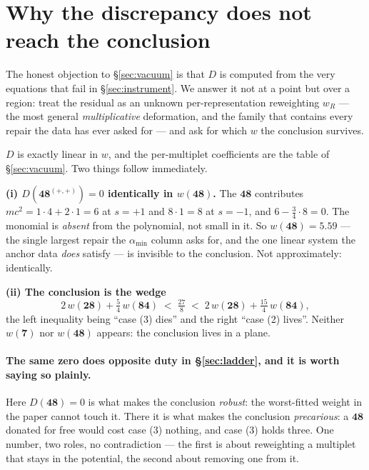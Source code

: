 \documentclass[11pt,a4paper]{article}
\newcommand{\rep}[1]{\mathbf{#1}}
\newcommand{\amin}{\alpha_{\min}}
\newenvironment{keyeq}
  {\begin{center}\setlength{\fboxsep}{9pt}\setlength{\fboxrule}{0.8pt}%
   \begin{lrbox}{\keyeqbox}\begin{minipage}{0.88\textwidth}}
  {\end{minipage}\end{lrbox}%
   \fcolorbox{hdrblue!55}{hdrblue!6}{\usebox{\keyeqbox}}\end{center}}
\begin{document}
\section{Why the discrepancy does not reach the conclusion}\label{sec:repair}

The honest objection to \S\ref{sec:vacuum} is that $D$ is computed from the very equations that fail
in \S\ref{sec:instrument}. We answer it not at a point but over a region: treat the residual as an
unknown per-representation reweighting $w_R$ --- the most general \emph{multiplicative} deformation,
and the family that contains every repair the data has ever asked for --- and ask for which $w$ the
conclusion survives.

$D$ is exactly linear in $w$, and the per-multiplet coefficients are the table of
\S\ref{sec:vacuum}. Two things follow immediately.

\begin{keyeq}
\textbf{(i) $D(\rep{48}^{(+,+)})=0$ identically in $w(\rep{48})$.} The $\rep{48}$ contributes
$mc^2=1\cdot4+2\cdot1=6$ at $s=+1$ and $8\cdot1=8$ at $s=-1$, and $6-\tfrac34\cdot8=0$. The monomial
is \emph{absent} from the polynomial, not small in it. So $w(\rep{48})=5.59$ --- the single largest
repair the $\amin$ column asks for, and the one linear system the anchor data \emph{does} satisfy
--- is invisible to the conclusion. Not approximately: identically.

\textbf{(ii) The conclusion is the wedge}
\[
2\,w(\rep{28})+\tfrac54\,w(\rep{84})\;<\;\tfrac{27}{8}\;<\;2\,w(\rep{28})+\tfrac{15}{4}\,w(\rep{84}),
\]
the left inequality being ``case (3) dies'' and the right ``case (2) lives''. Neither $w(\rep7)$ nor
$w(\rep{48})$ appears: the conclusion lives in a plane.
\end{keyeq}

\paragraph{The same zero does opposite duty in \S\ref{sec:ladder}, and it is worth saying so plainly.}
Here $D(\rep{48})=0$ is what makes the conclusion \emph{robust}: the worst-fitted weight in the paper
cannot touch it. There it is what makes the conclusion \emph{precarious}: a $\rep{48}$ donated for
free would cost case (3) nothing, and case (3) holds three. One number, two roles, no contradiction
--- the first is about reweighting a multiplet that stays in the potential, the second about removing
one from it.
\end{document}

